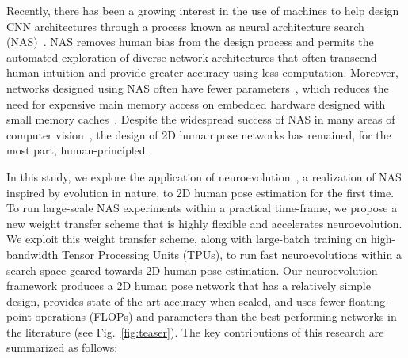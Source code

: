 \documentclass{ieeeaccess}
\begin{document}
Recently, there has been a growing interest in the use of machines to help design CNN architectures through a process known as neural architecture search (NAS)~\cite{zoph2017neural, baker2016designing, wistuba2019survey, weng2019unet}. NAS removes human bias from the design process and permits the automated exploration of diverse network architectures that often transcend human intuition and provide greater accuracy using less computation. Moreover, networks designed using NAS often have fewer parameters~\cite{tan2019mnasnet}, which reduces the need for expensive main memory access on embedded hardware designed with small memory caches~\cite{sandler2018mobilenetv2}. Despite the widespread success of NAS in many areas of computer vision~\cite{tan2019efficientnet, chen2018searching, liu2019auto, ghiasi2019fpn, nekrasov2019fast, zhu2019v, yan2021lighttrack}, the design of 2D human pose networks has remained, for the most part, human-principled. 

In this study, we explore the application of neuroevolution~\cite{rodrigues2020study}, a realization of NAS inspired by evolution in nature, to 2D human pose estimation for the first time. To run large-scale NAS experiments within a practical time-frame, we propose a new weight transfer scheme that is highly flexible and accelerates neuroevolution. We exploit this weight transfer scheme, along with large-batch training on high-bandwidth Tensor Processing Units (TPUs), to run fast neuroevolutions within a search space geared towards 2D human pose estimation. Our neuroevolution framework produces a 2D human pose network that has a relatively simple design, provides state-of-the-art accuracy when scaled, and uses fewer floating-point operations (FLOPs) and parameters than the best performing networks in the literature (see Fig.\ \ref{fig:teaser}). The key contributions of this research are summarized as follows:
\end{document}
